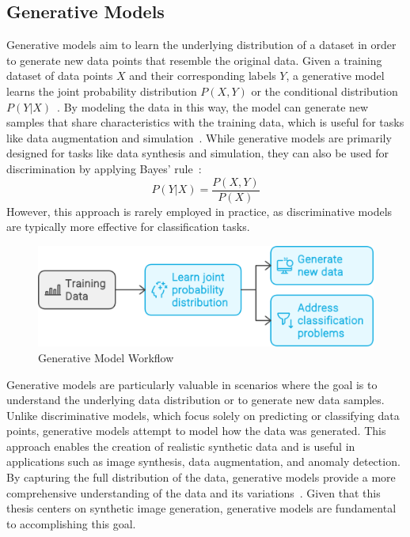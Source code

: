 \documentclass[12pt,DIV14,BCOR12mm,a4paper,footinclude=false,headinclude,parskip=half-,twoside,openright,cleardoublepage=empty,toc=index,bibliography=totoc,listof=totoc]{scrreprt}
\numberwithin{equation}{chapter}
\begin{document}
\subsection{Generative Models}
Generative models aim to learn the underlying distribution of a dataset in order to generate new data points that resemble the original data. Given a training dataset of data points \( X \) and their corresponding labels \( Y \), a generative model learns the joint probability distribution \( P(X, Y) \) or the conditional distribution \( P(Y|X) \)~\cite{deng2016deep}. By modeling the data in this way, the model can generate new samples that share characteristics with the training data, which is useful for tasks like data augmentation and simulation~\cite{zheng2023toward}. While generative models are primarily designed for tasks like data synthesis and simulation, they can also be used for discrimination by applying Bayes’ rule~\cite{ng2001discriminative}: 
\begin{equation}
P(Y|X) = \frac{P(X, Y)}{P(X)}
\end{equation}
However, this approach is rarely employed in practice, as discriminative models are typically more effective for classification tasks.
\begin{figure}
	\centering
	\includegraphics[scale=.3]{../media/Generative Model.png}
	\caption{Generative Model Workflow~\cite{Nanda:2024}}
	\label{gen}
\end{figure}
Generative models are particularly valuable in scenarios where the goal is to understand the underlying data distribution or to generate new data samples. Unlike discriminative models, which focus solely on predicting or classifying data points, generative models attempt to model how the data was generated. This approach enables the creation of realistic synthetic data and is useful in applications such as image synthesis, data augmentation, and anomaly detection. By capturing the full distribution of the data, generative models provide a more comprehensive understanding of the data and its variations~\cite{Nanda:2024}. Given that this thesis centers on synthetic image generation, generative models are fundamental to accomplishing this goal.
\end{document}
